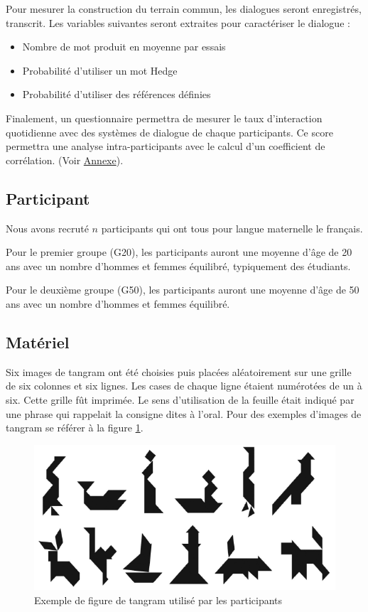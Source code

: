 \documentclass{article}
\begin{document}
Pour mesurer la construction du terrain commun, les dialogues seront enregistrés, transcrit. Les variables suivantes seront extraites pour caractériser le dialogue :
\begin{itemize}
    \item Nombre de mot produit en moyenne par essais
    \item Probabilité d'utiliser un mot Hedge
    \item Probabilité d'utiliser des références définies
\end{itemize}

Finalement, un questionnaire permettra de mesurer le taux d'interaction quotidienne avec des systèmes de dialogue de chaque participants. Ce score permettra une analyse intra-participants avec le calcul d'un coefficient de corrélation. (Voir \hyperlink{questionnaire}{Annexe}).

\subsection{Participant}
Nous avons recruté $ n $ participants qui ont tous pour langue maternelle le français.

Pour le premier groupe (G20), les participants auront une moyenne d'âge de 20 ans avec un nombre d'hommes et femmes équilibré, typiquement des étudiants.

Pour le deuxième groupe (G50), les participants auront une moyenne d'âge de 50 ans avec un nombre d'hommes et femmes équilibré.

\subsection{Matériel}
Six images de tangram ont été choisies puis placées aléatoirement sur une grille de six colonnes et six lignes. Les cases de chaque ligne étaient numérotées de un à six. Cette grille fût imprimée. Le sens d'utilisation de la feuille était indiqué par une phrase qui rappelait la consigne dites à l'oral. Pour des exemples d'images de tangram se référer à la figure \ref{tangram}.

\begin{figure}[!htbp]
    \centering
    \includegraphics*[width=.75\textwidth]{./tangram.png}
    \caption{Exemple de figure de tangram utilisé par les participants}
    \label{tangram}
\end{figure}
\end{document}
